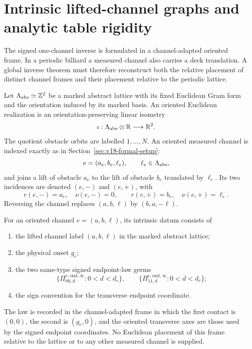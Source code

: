 \section{Intrinsic lifted-channel graphs and analytic table rigidity}
\label{sec:v23-intrinsic-multichannel-rigidity}

The signed one-channel inverse is formulated in a channel-adapted oriented
frame.  In a periodic billiard a measured channel also carries a deck
translation.  A global inverse theorem must therefore reconstruct both the
relative placement of distinct channel frames and their placement relative to
the periodic lattice.

Let \(\Lambda_{\rm abs}\simeq\mathbb Z^2\) be a marked abstract lattice with
its fixed Euclidean Gram form and the orientation induced by its marked basis.
An oriented Euclidean realization is an orientation-preserving linear isometry
\[
 \iota:\Lambda_{\rm abs}\otimes\mathbb R\longrightarrow\mathbb R^2.
\]
The quotient obstacle orbits are labelled \(1,\ldots,N\).  An oriented
measured channel is indexed exactly as in Section~\ref{sec:v18-formal-setup}:
\[
                         e=(a_e,b_e,\ell_e),
 \qquad \ell_e\in\Lambda_{\rm abs},
\]
and joins a lift of obstacle \(a_e\) to the lift of obstacle \(b_e\) translated
by \(\ell_e\).  Its two incidences are denoted \((e,-)\) and \((e,+)\), with
\begin{equation}\label{eq:v23-incidence-labels}
 r(e,-)=a_e,\quad \nu(e,-)=0,
 \qquad
 r(e,+)=b_e,\quad \nu(e,+)=\ell_e.
\end{equation}
Reversing the channel replaces \((a,b,\ell)\) by
\((b,a,-\ell)\).

\begin{definition}
\label{def:v23-intrinsic-channel-datum}
For an oriented channel \(e=(a,b,\ell)\), its intrinsic datum consists of
\begin{enumerate}
\item the lifted channel label \((a,b,\ell)\) in the marked abstract lattice;
\item the physical onset \(g_e\);
\item the two same-type signed endpoint-law germs
\[
 \{\Pi^{e,\mathrm{end},\infty}_{00,d}:0<d<d_e\},\qquad
 \{\Pi^{e,\mathrm{end},\infty}_{11,d}:0<d<d_e\};
\]
\item the sign convention for the transverse endpoint coordinate.
\end{enumerate}
The law is recorded in the channel-adapted frame in which the first contact is
\((0,0)\), the second is \((g_e,0)\), and the oriented transverse axes are
those used by the signed endpoint coordinates.  No Euclidean placement of
this frame relative to the lattice or to any other measured channel is
supplied.
\end{definition}


